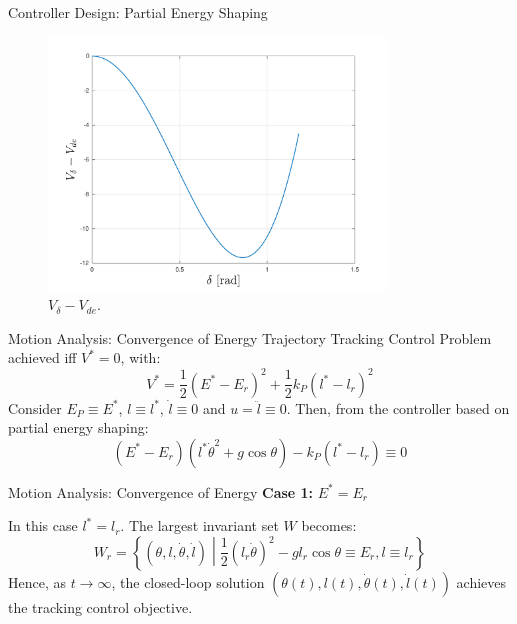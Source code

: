 \documentclass[10pt]{beamer}
\begin{document}
  \begin{frame}{Controller Design: Partial Energy Shaping}
    \begin{figure}
      \caption{$V_\delta-V_{de}$.}
      \vspace{-0.3cm}
      \includegraphics[width=0.8\textwidth]{images/partial_3.pdf}
    \end{figure}
  \end{frame}

  \begin{frame}{Motion Analysis: Convergence of Energy}
    Trajectory Tracking Control Problem achieved iff $V^*=0$, with:
    \begin{equation*}
      V^* = \frac{1}{2}(E^*-E_r)^2+\frac{1}{2}k_P(l^*-l_r)^2
    \end{equation*}
    Consider $E_P \equiv E^*$, $l \equiv l^*$, $\dot{l} \equiv 0$
    and $u = \ddot{l} \equiv 0$. Then, from the controller
    based on partial energy shaping:
    \begin{equation*}
      (E^*-E_r)(l^*\dot{\theta}^2+g\cos\theta)-k_P(l^*-l_r) \equiv 0
    \end{equation*}
  \end{frame}

  \begin{frame}{Motion Analysis: Convergence of Energy}
    \noindent \textbf{Case 1:} $E^* = E_r$

    In this case $l^* = l_r$. The largest invariant set $W$ becomes:
    \begin{equation*}
      W_r = \left\{ (\theta, l, \dot{\theta}, \dot{l})
        \middle| \frac{1}{2} (l_r \dot{\theta})^2 -
        g l_r \cos\theta \equiv E_r, l \equiv l_r \right\}
    \end{equation*}
    Hence, as $t \to \infty$, the closed-loop solution
    $(\theta(t), l(t), \dot{\theta}(t), \dot{l}(t))$ achieves the
    tracking control objective.
  \end{frame}
\end{document}

